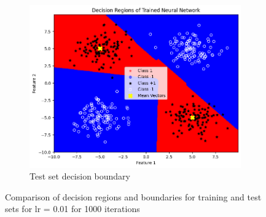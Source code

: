 \documentclass[a4paper,12pt]{article}
\begin{document}
\begin{figure}[H]
    \begin{subfigure}{0.45\textwidth}
        \centering
        \includegraphics[width=\textwidth]{2.3_.01_1000_Test.png}
        \caption{Test set decision boundary}
    \end{subfigure}

    \caption{Comparison of decision regions and boundaries for training and test sets for lr = 0.01 for 1000 iterations}
\end{figure}
\end{document}
